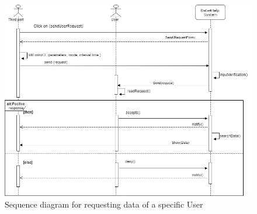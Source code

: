 \begin{figure}[H]
    \centering
    \includegraphics[scale=0.4]{rasdL/Pictures/request1.png}
    \caption{Sequence diagram for requesting data of a specific User}
  
\end{figure}